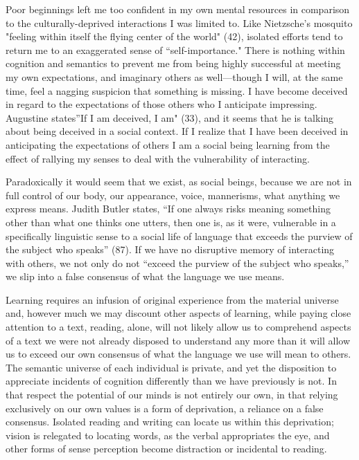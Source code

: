 \documentclass[
]{memoir}
\begin{document}
Poor beginnings left me too confident in my own mental resources in
comparison to the culturally-deprived interactions I was limited to.
Like Nietzsche's mosquito "feeling within itself the flying center of
the world" (42), isolated efforts tend to return me to an exaggerated
sense of ``self-importance." There is nothing within cognition and
semantics to prevent me from being highly successful at meeting my own
expectations, and imaginary others as well---though I will, at the same
time, feel a nagging suspicion that something is missing. I have become
deceived in regard to the expectations of those others who I anticipate
impressing. Augustine states''If I am deceived, I am" (33), and it seems
that he is talking about being deceived in a social context. If I
realize that I have been deceived in anticipating the expectations of
others I am a social being learning from the effect of rallying my
senses to deal with the vulnerability of interacting.

Paradoxically it would seem that we exist, as social beings, because we
are not in full control of our body, our appearance, voice, mannerisms,
what anything we express means. Judith Butler states, ``If one always
risks meaning something other than what one thinks one utters, then one
is, as it were, vulnerable in a specifically linguistic sense to a
social life of language that exceeds the purview of the subject who
speaks'' (87). If we have no disruptive memory of interacting with
others, we not only do not ``exceed the purview of the subject who
speaks,'' we slip into a false consensus of what the language we use
means.

Learning requires an infusion of original experience from the material
universe and, however much we may discount other aspects of learning,
while paying close attention to a text, reading, alone, will not likely
allow us to comprehend aspects of a text we were not already disposed to
understand any more than it will allow us to exceed our own consensus of
what the language we use will mean to others. The semantic universe of
each individual is private, and yet the disposition to appreciate
incidents of cognition differently than we have previously is not. In
that respect the potential of our minds is not entirely our own, in that
relying exclusively on our own values is a form of deprivation, a
reliance on a false consensus. Isolated reading and writing can locate
us within this deprivation; vision is relegated to locating words, as
the verbal appropriates the eye, and other forms of sense perception
become distraction or incidental to reading.
\end{document}
